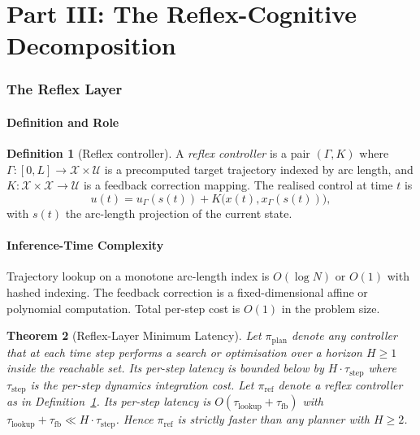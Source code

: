 \documentclass[11pt,twocolumn]{article}
\newtheorem{theorem}{Theorem}
\theoremstyle{definition}
\newtheorem{definition}[theorem]{Definition}
\theoremstyle{remark}
\providecommand{\cU}{\mathcal{U}}
\providecommand{\cX}{\mathcal{X}}
\begin{document}
\part*{Part III: The Reflex-Cognitive Decomposition}

\section{The Reflex Layer}
\label{sec:reflex-arch}

\subsection{Definition and Role}

\begin{definition}[Reflex controller]\label{def:reflex}
A \emph{reflex controller} is a pair $(\Gamma, K)$ where $\Gamma: [0, L] \to \cX \times \cU$ is a precomputed target trajectory indexed by arc length, and $K: \cX \times \cX \to \cU$ is a feedback correction mapping. The realised control at time $t$ is
\begin{equation}
u(t) = u_{\Gamma}(s(t)) + K\big(x(t), x_{\Gamma}(s(t))\big),
\end{equation}
with $s(t)$ the arc-length projection of the current state.
\end{definition}

\subsection{Inference-Time Complexity}

Trajectory lookup on a monotone arc-length index is $O(\log N)$ or $O(1)$ with hashed indexing. The feedback correction is a fixed-dimensional affine or polynomial computation. Total per-step cost is $O(1)$ in the problem size.

\begin{theorem}[Reflex-Layer Minimum Latency]\label{thm:reflex-min}
Let $\pi_{\mathrm{plan}}$ denote any controller that at each time step performs a search or optimisation over a horizon $H \ge 1$ inside the reachable set. Its per-step latency is bounded below by $H \cdot \tau_{\mathrm{step}}$ where $\tau_{\mathrm{step}}$ is the per-step dynamics integration cost. Let $\pi_{\mathrm{ref}}$ denote a reflex controller as in Definition~\ref{def:reflex}. Its per-step latency is $O(\tau_{\mathrm{lookup}} + \tau_{\mathrm{fb}})$ with $\tau_{\mathrm{lookup}} + \tau_{\mathrm{fb}} \ll H \cdot \tau_{\mathrm{step}}$. Hence $\pi_{\mathrm{ref}}$ is strictly faster than any planner with $H \ge 2$.
\end{theorem}
\end{document}

